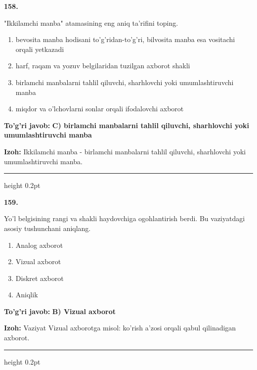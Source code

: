 \documentclass[10pt,a4paper,oneside]{article}
\begin{document}
\noindent\textbf{\color{ink}158.}
\par
"Ikkilamchi manba" atamasining eng aniq ta'rifini toping.
\begin{enumerate}[label=\Alph*),leftmargin=9mm]
\item bevosita manba hodisani to'g'ridan-to'g'ri, bilvosita manba esa vositachi orqali yetkazadi
\item harf, raqam va yozuv belgilaridan tuzilgan axborot shakli
\item birlamchi manbalarni tahlil qiluvchi, sharhlovchi yoki umumlashtiruvchi manba
\item miqdor va o'lchovlarni sonlar orqali ifodalovchi axborot
\end{enumerate}
\begin{tcolorbox}[enhanced,breakable,colback=teal!4,colframe=teal!50!black,boxrule=0.5pt,arc=1.1mm,left=3mm,right=3mm,top=1.7mm,bottom=1.7mm,before skip=2mm,after skip=2mm]
\textbf{\color{teal}To'g'ri javob:} \textbf{C) birlamchi manbalarni tahlil qiluvchi, sharhlovchi yoki umumlashtiruvchi manba}
\par\smallskip
\textbf{Izoh:} Ikkilamchi manba - birlamchi manbalarni tahlil qiluvchi, sharhlovchi yoki umumlashtiruvchi manba.
\end{tcolorbox}
\vspace{2mm}\hrule height 0.2pt \vspace{3mm}

\noindent\textbf{\color{ink}159.}
\par
Yo'l belgisining rangi va shakli haydovchiga ogohlantirish berdi. Bu vaziyatdagi asosiy tushunchani aniqlang.
\begin{enumerate}[label=\Alph*),leftmargin=9mm]
\item Analog axborot
\item Vizual axborot
\item Diskret axborot
\item Aniqlik
\end{enumerate}
\begin{tcolorbox}[enhanced,breakable,colback=teal!4,colframe=teal!50!black,boxrule=0.5pt,arc=1.1mm,left=3mm,right=3mm,top=1.7mm,bottom=1.7mm,before skip=2mm,after skip=2mm]
\textbf{\color{teal}To'g'ri javob:} \textbf{B) Vizual axborot}
\par\smallskip
\textbf{Izoh:} Vaziyat Vizual axborotga misol: ko'rish a'zosi orqali qabul qilinadigan axborot.
\end{tcolorbox}
\vspace{2mm}\hrule height 0.2pt \vspace{3mm}
\end{document}

